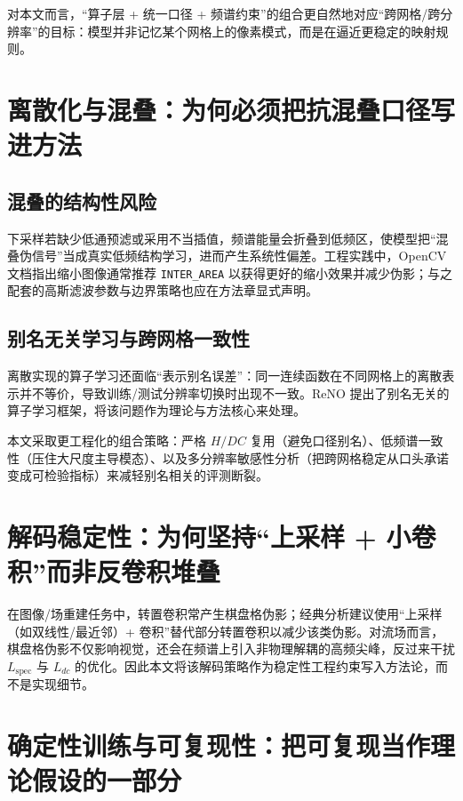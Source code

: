 对本文而言，“算子层 + 统一口径 + 频谱约束”的组合更自然地对应“跨网格/跨分辨率”的目标：模型并非记忆某个网格上的像素模式，而是在逼近更稳定的映射规则。

\section{离散化与混叠：为何必须把抗混叠口径写进方法}\label{sec:aliasing}

\subsection{混叠的结构性风险}\label{sec:alias_risk}
下采样若缺少低通预滤或采用不当插值，频谱能量会折叠到低频区，使模型把“混叠伪信号”当成真实低频结构学习，进而产生系统性偏差。工程实践中，OpenCV 文档指出缩小图像通常推荐 \texttt{INTER\_AREA} 以获得更好的缩小效果并减少伪影\cite{opencv_resize}；与之配套的高斯滤波参数与边界策略也应在方法章显式声明\cite{opencv_gaussianblur}。

\subsection{别名无关学习与跨网格一致性}\label{sec:reno}
离散实现的算子学习还面临“表示别名误差”：同一连续函数在不同网格上的离散表示并不等价，导致训练/测试分辨率切换时出现不一致。ReNO 提出了别名无关的算子学习框架，将该问题作为理论与方法核心来处理\cite{bartolucci2023reno}。

本文采取更工程化的组合策略：严格 $H/DC$ 复用（避免口径别名）、低频谱一致性（压住大尺度主导模态）、以及多分辨率敏感性分析（把跨网格稳定从口头承诺变成可检验指标）来减轻别名相关的评测断裂。

\section{解码稳定性：为何坚持“上采样 + 小卷积”而非反卷积堆叠}\label{sec:decoder}

在图像/场重建任务中，转置卷积常产生棋盘格伪影；经典分析建议使用“上采样（如双线性/最近邻）+ 卷积”替代部分转置卷积以减少该类伪影\cite{odena2016checkerboard}。对流场而言，棋盘格伪影不仅影响视觉，还会在频谱上引入非物理解耦的高频尖峰，反过来干扰 $L_{\text{spec}}$ 与 $L_{dc}$ 的优化。因此本文将该解码策略作为稳定性工程约束写入方法论，而不是实现细节。

\section{确定性训练与可复现性：把可复现当作理论假设的一部分}\label{sec:repro}

